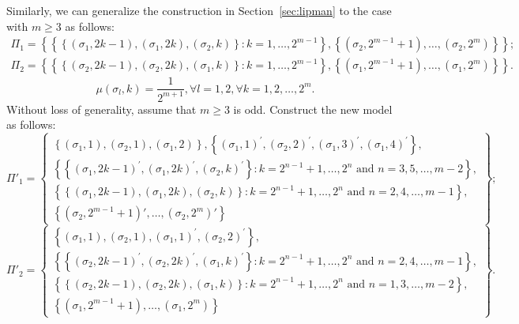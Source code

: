 \documentclass[12pt,reqno]{amsart}
\begin{document}
Similarly, we can generalize the construction in Section~\ref{sec:lipman} to the case with $m\geq
3 $ as follows: 
\begingroup\small
\begin{eqnarray*}
\Pi _{1}=\left\{ \left\{ \left\{ \left( \sigma_{1},2k-1\right) ,\left(
\sigma_{1},2k\right) ,\left( \sigma_{2},k\right) \right\} :k=1,\ldots,2^{m-1}\right\}
,\left\{ \left( \sigma_{2},2^{m-1}+1\right) ,\ldots,\left( \sigma_{2},2^{m}\right)
\right\} \right\} \text{;} \\
\Pi _{2}=\left\{ \left\{ \left\{ \left( \sigma_{2},2k-1\right) ,\left(
\sigma_{2},2k\right) ,\left( \sigma_{1},k\right) \right\} :k=1,\ldots,2^{m-1}\right\}
,\left\{ \left( \sigma_{1},2^{m-1}+1\right) ,\ldots,\left( \sigma_{1},2^{m}\right)
\right\} \right\} \text{.}
\end{eqnarray*}%
\[
\mu \left( \sigma_{l},k\right) =\frac{1}{2^{m+1}},\forall l=1,2,\forall
k=1,2,\ldots,2^{m}\text{.} 
\]%
Without loss of generality, assume that $m\geq 3$ is odd. Construct the new
model as follows: 
\[
\Pi'_{1}=\left\{ 
\begin{array}{c}
\left\{ \left( \sigma_{1},1\right) ,\left( \sigma_{2},1\right) ,\left( \sigma_{1},2\right)
\right\} ,\left\{ \left( \sigma_{1},1\right) ^{\prime },\left( \sigma_{2},2\right)
^{\prime },\left( \sigma_{1},3\right) ^{\prime },\left( \sigma_{1},4\right) ^{\prime
}\right\} , \\ 
\left\{ \left\{ \left( \sigma_{1},2k-1\right) ^{\prime },\left( \sigma_{1},2k\right)
^{\prime },\left( \sigma_{2},k\right) ^{\prime }\right\} :k=2^{n-1}+1,\ldots,2^{n}%
\text{ and }n=3,5,\ldots,m-2\right\} , \\ 
\left\{ \left\{ \left( \sigma_{1},2k-1\right) ,\left( \sigma_{1},2k\right) ,\left(
\sigma_{2},k\right) \right\} :k=2^{n-1}+1,\ldots,2^{n}\text{ and }%
n=2,4,\ldots,m-1\right\} , \\ 
\left\{ \left( \sigma_{2},2^{m-1}+1\right)' ,\ldots,\left( \sigma_{2},2^{m}\right)'
\right\}%
\end{array}%
\right\} \text{;} 
\]%
\[
\Pi' _{2}=\left\{ 
\begin{array}{c}
\left\{ \left( \sigma_{1},1\right) ,\left( \sigma_{2},1\right) ,\left( \sigma_{1},1\right)
^{\prime },\left( \sigma_{2},2\right) ^{\prime }\right\} , \\ 
\left\{ \left\{ \left( \sigma_{2},2k-1\right) ^{\prime },\left( \sigma_{2},2k\right)
^{\prime },\left( \sigma_{1},k\right) ^{\prime }\right\} :k=2^{n-1}+1,\ldots,2^{n}%
\text{ and }n=2,4,\ldots,m-1\right\} , \\ 
\left\{ \left\{ \left( \sigma_{2},2k-1\right) ,\left( \sigma_{2},2k\right) ,\left(
\sigma_{1},k\right) \right\} :k=2^{n-1}+1,\ldots,2^{n}\text{ and }%
n=1,3,\ldots,m-2\right\} , \\ 
\left\{ \left( \sigma_{1},2^{m-1}+1\right),\ldots,\left(
\sigma_{1},2^{m}\right) \right\}%
\end{array}%
\right\} \text{.} 
\]
\endgroup
\end{document}
